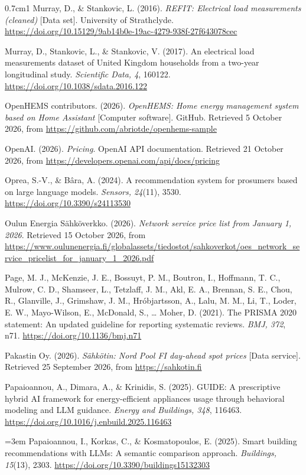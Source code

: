\documentclass[12pt,a4paper]{report}
\begin{document}
\begin{hangparas}{0.7cm}{1}
Murray, D., \& Stankovic, L. (2016). \textit{REFIT: Electrical load
measurements (cleaned)} [Data set]. University of Strathclyde.
\url{https://doi.org/10.15129/9ab14b0e-19ac-4279-938f-27f643078cec}

Murray, D., Stankovic, L., \& Stankovic, V. (2017). An electrical load
measurements dataset of United Kingdom households from a two-year
longitudinal study. \textit{Scientific Data, 4}, 160122.
\url{https://doi.org/10.1038/sdata.2016.122}

OpenHEMS contributors. (2026). \textit{OpenHEMS: Home energy management
system based on Home Assistant} [Computer software]. GitHub. Retrieved
5 October 2026, from \url{https://github.com/abriotde/openhems-sample}

OpenAI. (2026). \textit{Pricing}. OpenAI API documentation. Retrieved 21
October 2026, from \url{https://developers.openai.com/api/docs/pricing}

Oprea, S.-V., \& Bâra, A. (2024). A recommendation system for prosumers
based on large language models. \textit{Sensors, 24}(11), 3530.
\url{https://doi.org/10.3390/s24113530}

Oulun Energia Sähköverkko. (2026). \textit{Network service price list
from January 1, 2026}. Retrieved 15 October 2026, from
\url{https://www.oulunenergia.fi/globalassets/tiedostot/sahkoverkot/oes_network_service_pricelist_for_january_1_2026.pdf}

Page, M. J., McKenzie, J. E., Bossuyt, P. M., Boutron, I., Hoffmann,
T. C., Mulrow, C. D., Shamseer, L., Tetzlaff, J. M., Akl, E. A.,
Brennan, S. E., Chou, R., Glanville, J., Grimshaw, J. M., Hróbjartsson,
A., Lalu, M. M., Li, T., Loder, E. W., Mayo-Wilson, E., McDonald, S.,
\ldots{} Moher, D. (2021). The PRISMA 2020 statement: An updated
guideline for reporting systematic reviews. \textit{BMJ, 372}, n71.
\url{https://doi.org/10.1136/bmj.n71}

Pakastin Oy. (2026). \textit{Sähkötin: Nord Pool FI day-ahead spot
prices} [Data service]. Retrieved 25 September 2026, from
\url{https://sahkotin.fi}

Papaioannou, A., Dimara, A., \& Krinidis, S. (2025). GUIDE: A
prescriptive hybrid AI framework for energy-efficient appliances usage
through behavioral modeling and LLM guidance. \textit{Energy and
Buildings, 348}, 116463.
\url{https://doi.org/10.1016/j.enbuild.2025.116463}

{\emergencystretch=3em
Papaioannou, I., Korkas, C., \& Kosmatopoulos, E. (2025). Smart building
recommendations with LLMs: A semantic comparison approach.
\textit{Buildings, 15}(13), 2303.
\url{https://doi.org/10.3390/buildings15132303}\par}


\end{hangparas}
\end{document}
